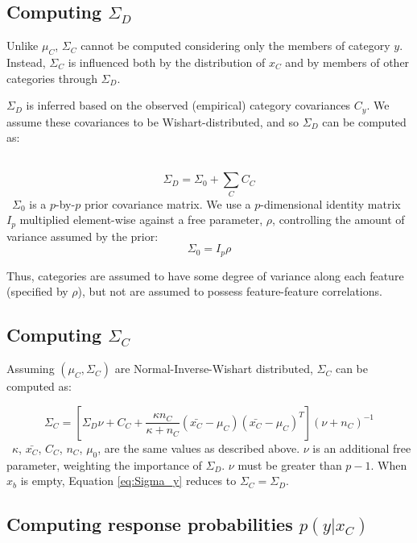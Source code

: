 \documentclass[12pt]{article}
\begin{document}
\subsection*{Computing $\Sigma_D$}

Unlike $\mu_C$, $\Sigma_C$ cannot be computed considering only the members of category $y$. Instead, $\Sigma_C$ is influenced both by the distribution of $x_C$ and by members of other categories through $\Sigma_D$.

$\Sigma_D$ is inferred based on the observed (empirical) category covariances $C_y$. We assume these covariances to be Wishart-distributed, and so $\Sigma_D$ can be computed as:

\
\begin{equation}
    \Sigma_D = \Sigma_0 + \sum_{C}{C_C}
\end{equation}
\
$\Sigma_{0}$ is a $p$-by-$p$ prior covariance matrix. We use a $p$-dimensional identity matrix $I_p$ multiplied element-wise against a free parameter, $\rho$, controlling the amount of variance assumed by the prior:
\
\begin{equation}
    \Sigma_0 =  I_p\rho
\end{equation}

Thus, categories are assumed to have some degree of variance along each feature (specified by $\rho$), but not are assumed to possess feature-feature correlations.

\subsection*{Computing $\Sigma_C$}

Assuming $(\mu_C, \Sigma_C)$ are Normal-Inverse-Wishart distributed, $\Sigma_C$ can be computed as:

\begin{equation}
  \Sigma_C = [\Sigma_D\nu + C_C +
    \dfrac
    {\kappa n_C}
    {\kappa + n_C}
    (\bar{x_C}-\mu_C)(\bar{x_C}-\mu_C)^T
  ] (\nu + n_C)^{-1}
  \label{eq:Sigma_y}
\end{equation}
\
$\kappa$, $\bar{x_C}$, $C_C$, $n_C$, $\mu_0$,  are the same values as described above. $\nu$ is an additional free parameter, weighting the importance of $\Sigma_{D}$. $\nu$ must be greater than $p-1$. When $x_b$ is empty, Equation \ref{eq:Sigma_y} reduces to $\Sigma_C = \Sigma_D$.

\subsection*{Computing response probabilities $p(y | x_C)$}
\end{document}
